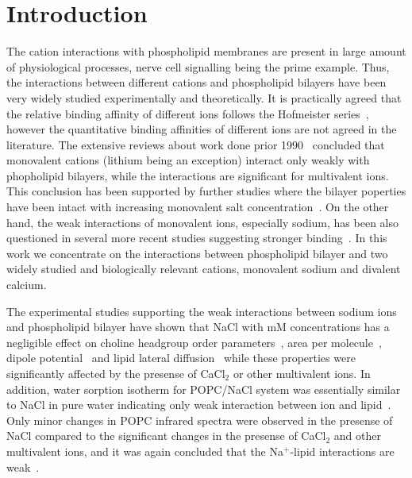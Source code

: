 \documentclass[pre,aps,floatfix,authordate1-4,twocolumn]{revtex4-1}
\begin{document}
\section{Introduction}

The cation interactions with phospholipid membranes are present in large amount
of physiological processes, nerve cell signalling being the prime example.
Thus, the interactions between different cations and phospholipid bilayers have been very widely studied experimentally
and theoretically. It is practically agreed that the relative binding affinity of different
ions follows the Hofmeister series~\cite{eisenberg79,cevc90,tocanne90,binder02,celma07,leontidis09,vacha09a,klasczyk10,harb13}, however the quantitative binding affinities of different
ions are not agreed in the literature. The extensive reviews about work done prior 1990~\cite{cevc90,tocanne90}
concluded that monovalent cations (lithium being an exception) interact only weakly with phopholipid bilayers, 
while the interactions are significant for multivalent ions. This conclusion has been supported by
further studies where the bilayer poperties have been intact with increasing monovalent salt 
concentration~\cite{binder02,pabst07,filippov09}. On the other hand, the weak interactions of monovalent ions, especially
sodium, has been also questioned in several more recent studies suggesting stronger 
binding~\cite{bockmann03,bockmann04,vacha09a,manyes05,manyes06,fukuma07,leontidis09,ferber11,morata12,klasczyk10,harb13}. In this work we concentrate on the 
interactions between phospholipid bilayer and two widely studied and biologically relevant cations, monovalent sodium and divalent calcium.

The experimental studies supporting the weak interactions between sodium ions and phospholipid bilayer
have shown that NaCl with mM concentrations has a negligible effect on 
choline headgroup order parameters~\cite{akutsu81}, area per molecule~\cite{pabst07}, dipole potential~\cite{clarke99}
and lipid lateral diffusion~\cite{filippov09} while these properties were significantly affected by the presense
of CaCl$_2$ or other multivalent ions. In addition, water sorption isotherm for POPC/NaCl system
was essentially similar to NaCl in pure water indicating only weak interaction between ion and lipid~\cite{binder02}.
Only minor changes in POPC infrared spectra were observed in the presense of NaCl compared to the significant 
changes in the presense of CaCl$_2$ and other multivalent ions, and it was again concluded that the Na$^+$-lipid interactions are weak~\cite{binder02}.
\end{document}
